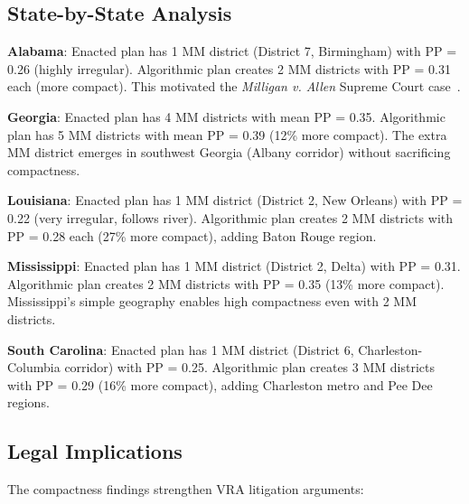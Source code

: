 \subsection{State-by-State Analysis}

\textbf{Alabama}: Enacted plan has 1 MM district (District 7, Birmingham) with PP = 0.26 (highly irregular). Algorithmic plan creates 2 MM districts with PP = 0.31 each (more compact). This motivated the \textit{Milligan v. Allen} Supreme Court case~\cite{milligan2023}.

\textbf{Georgia}: Enacted plan has 4 MM districts with mean PP = 0.35. Algorithmic plan has 5 MM districts with mean PP = 0.39 (12\% more compact). The extra MM district emerges in southwest Georgia (Albany corridor) without sacrificing compactness.

\textbf{Louisiana}: Enacted plan has 1 MM district (District 2, New Orleans) with PP = 0.22 (very irregular, follows river). Algorithmic plan creates 2 MM districts with PP = 0.28 each (27\% more compact), adding Baton Rouge region.

\textbf{Mississippi}: Enacted plan has 1 MM district (District 2, Delta) with PP = 0.31. Algorithmic plan creates 2 MM districts with PP = 0.35 (13\% more compact). Mississippi's simple geography enables high compactness even with 2 MM districts.

\textbf{South Carolina}: Enacted plan has 1 MM district (District 6, Charleston-Columbia corridor) with PP = 0.25. Algorithmic plan creates 3 MM districts with PP = 0.29 (16\% more compact), adding Charleston metro and Pee Dee regions.

\subsection{Legal Implications}

The compactness findings strengthen VRA litigation arguments:

